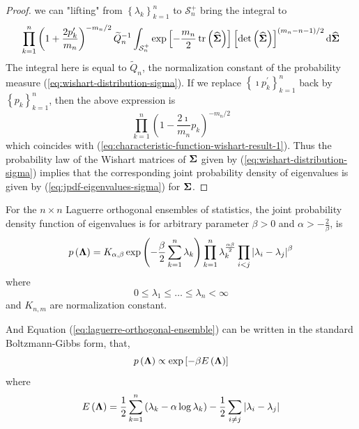 \begin{proof}
	we can "lifting" from $\left\{\lambda_{k}\right\}_{k=1}^{n}$ to $\mathcal{S}_{n}^{+}$ bring the integral to
	\begin{equation*}
		\prod_{k=1}^{n}\left(1+\frac{2p_{k}^{\prime}}{m_{n}}\right)^{-m_{n}/2}\widetilde{Q}_{n}^{-1}\int_{\mathcal{S}_{n}^{+}}\exp\left[-\frac{m_{n}}{2}\operatorname{tr}\left(\widehat{\boldsymbol{\Sigma}}\right)\right]\left[\operatorname{det}\left(\widehat{\boldsymbol{\Sigma}}\right)\right]^{(m_{n}-n-1)/2}\mathop{}\!\mathrm{d}\widehat{\boldsymbol{\Sigma}}
	\end{equation*}
	The integral here is equal to $\widetilde{Q}_{n}$, the normalization constant of the probability measure (\ref{eq:wishart-distribution-sigma}). If we replace $\left\{\imath p_{k}^{\prime}\right\}_{k=1}^{n}$ back by $\left\{p_{k}\right\}_{k=1}^{n}$, then the above expression is
	\begin{equation*}
		\prod_{k=1}^{n}\left(1-\frac{2\imath}{m_n}p_{k}\right)^{-m_{n}/2}
	\end{equation*}
	which coincides with (\ref{eq:characteristic-function-wishart-result-1}). Thus the probability law of the Wishart matrices of $\boldsymbol{\Sigma}$ given by (\ref{eq:wishart-distribution-sigma}) implies that the corresponding joint probability density of eigenvalues is given by (\ref{eq:jpdf-eigenvalues-sigma}) for $\boldsymbol{\Sigma}$.
\end{proof}

\begin{definition}
	For the $n\times n$ Laguerre orthogonal ensembles of statistics, the joint probability density function of eigenvalues is
	for arbitrary parameter $\beta>0$ and $\alpha>-\frac{2}{\beta}$, is
	\begin{equation}
		p\left(\boldsymbol{\Lambda}\right)=K_{\alpha,\beta}\exp\left(-\frac{\beta}{2}\sum_{k=1}^{n}\lambda_{k}\right)\prod_{k=1}^{n} \lambda_{k}^{\frac{\alpha\beta}{2}}\prod_{i<j}\left|\lambda_{i}-\lambda_{j}\right|^{\beta}
		\label{eq:laguerre-orthogonal-ensemble}
	\end{equation}
	where
	\begin{equation*}
		0\leq\lambda_{1}\leq\ldots\leq\lambda_{n}<\infty
	\end{equation*}
	and $K_{n,m}$ are normalization constant.
\end{definition}

And Equation (\ref{eq:laguerre-orthogonal-ensemble}) can be written in the standard Boltzmann-Gibbs form, that,
\begin{equation*}
	p\left(\boldsymbol{\Lambda}\right)\propto\exp\left[-\beta E\left(\boldsymbol{\Lambda}\right)\right]
\end{equation*}
where
\begin{equation}
	E\left(\boldsymbol{\Lambda}\right)=\frac{1}{2}\sum_{k=1}^{n}\left(\lambda_{k}-\alpha\log\lambda_{k}\right)-\frac{1}{2}\sum_{i\neq j}\left|\lambda_{i}-\lambda_{j}\right|
\end{equation}

